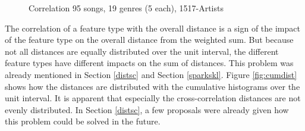 \begin{figure}[htbp]
	\centering
	\caption{Correlation 95 songs, 19 genres (5 each), 1517-Artists}
	\label{fig:corr2}
\end{figure}\FloatBarrier

\noindent The correlation of a feature type with the overall distance is a sign of the impact of the feature type on the overall distance from the weighted sum. But because not all distances are equally distributed over the unit interval, the different feature types have different impacts on the sum of distances. This problem was already mentioned in Section \ref{distsc} and Section \ref{sparkskl}. Figure \ref{fig:cumdist} shows how the distances are distributed with the cumulative histograms over the unit interval. It is apparent that especially the cross-correlation distances are not evenly distributed. In Section \ref{distsc}, a few proposals were already given how this problem could be solved in the future. 

